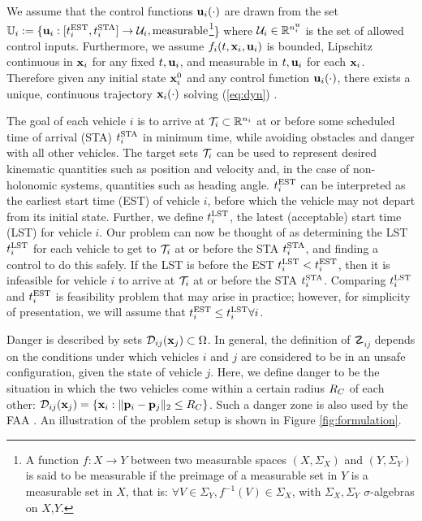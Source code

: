 \documentclass[letterpaper, 10pt, conference]{ieeeconf}      %
\begin{document}
We assume that the control functions $\mathbf{u}_i(\cdot)$ are drawn from the set $\mathbb{U}_i := \{\mathbf{u}_i: [t^{\text{EST}}_i, t^{\text{STA}}_i] \rightarrow \mathcal{U}_i, \text{measurable}$\footnote{
A function $f:X\to Y$ between two measurable spaces $(X,\Sigma_X)$ and $(Y,\Sigma_Y)$ is said to be measurable if the preimage of a measurable set in $Y$ is a measurable set in $X$, that is: $\forall V\in\Sigma_Y, f^{-1}(V)\in\Sigma_X$, with $\Sigma_X,\Sigma_Y$ $\sigma$-algebras on $X$,$Y$.}\} where $\mathcal{U}_i \in \mathbb{R}^{n^{\mathbf{u}}_i}$ is the set of allowed control inputs. Furthermore, we assume $f_i(t,\mathbf{x}_i, \mathbf{u}_i)$ is bounded, Lipschitz continuous in $\mathbf{x}_i$ for any fixed $t,\mathbf{u}_i$, and measurable in $t, \mathbf{u}_i$ for each $\mathbf{x}_i$. Therefore given any initial state $\mathbf{x}_i^0$ and any control function $\mathbf{u}_i(\cdot)$, there exists a unique, continuous trajectory $\mathbf{x}_i(\cdot)$ solving (\ref{eq:dyn}) \cite{coddington55}.

The goal of each vehicle $i$ is to arrive at $\mathcal{T}_i \subset \mathbb{R}^{n_i}$ at or before some scheduled time of arrival (STA) $t^{\text{STA}}_i$ in minimum time, while avoiding obstacles and danger with all other vehicles. The target sets $\mathcal{T}_i$ can be used to represent desired kinematic quantities such as position and velocity and, in the case of non-holonomic systems, quantities such as heading angle.  $t^{\text{EST}}_i$ can be interpreted as the earliest start time (EST) of vehicle $i$, before which the vehicle may not depart from its initial state. Further, we define $t^{\text{LST}}_i$, the latest (acceptable) start time (LST) for vehicle $i$. Our problem can now be thought of as determining the LST $t^{\text{LST}}_i$ for each vehicle to get to $\mathcal{T}_i$ at or before the STA $t^{\text{STA}}_i$, and finding a control to do this safely. If the LST is before the EST $t^{\text{LST}}_i < t^{\text{EST}}_i$, then it is infeasible for vehicle $i$ to arrive at $\mathcal{T}_i$ at or before the STA $t^{\text{STA}}_i$. Comparing $t^{\text{LST}}_i$ and $t^{\text{EST}}_i$ is feasibility problem that may arise in practice; however, for simplicity of presentation, we will assume that $t^{\text{EST}}_i\le t^{\text{LST}}_i \forall i$.

Danger is described by sets $\mathcal{D}_{ij}(\mathbf{x}_j) \subset \Omega$. In general, the definition of $\danger_{ij}$ depends on the conditions under which vehicles $i$ and $j$ are considered to be in an unsafe configuration, given the state of vehicle $j$. Here, we define danger to be the situation in which the two vehicles come within a certain radius $R_C$ of each other: $\mathcal{D}_{ij}(\mathbf{x}_j) = \{\mathbf{x}_i: \| \mathbf{p}_i - \mathbf{p}_j\|_2 \le R_C \}$. Such a danger zone is also used by the FAA \cite{paglione99}. An illustration of the problem setup is shown in Figure \ref{fig:formulation}.
\end{document}
